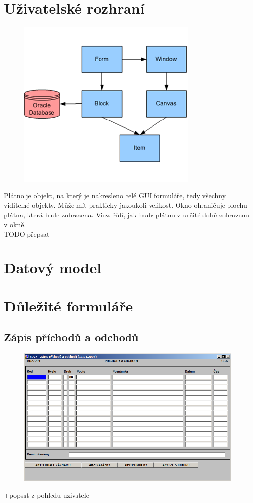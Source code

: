 \documentclass{bakalarka}
\begin{document}
\section{Uživatelské rozhraní}
\begin{figure}[H]
  \centering
  \includegraphics[scale=0.8]{obr/window.png}
  \label{}
\end{figure}
Plátno je objekt, na který je nakresleno celé GUI formuláře, tedy všechny viditelné objekty. Může mít prakticky jakoukoli velikost. Okno ohraničuje plochu plátna, která bude zobrazena. View řídí, jak bude plátno v určité době zobrazeno v okně.\\
TODO přepsat


\section{Datový model}

\section{Důležité formuláře}

\subsection{Zápis příchodů a odchodů}
\begin{figure}[H]
  \centering
  \includegraphics[scale=0.6]{obr/BD27.png}
  \label{}
\end{figure}
+popsat z pohledu uzivatele
\end{document}
